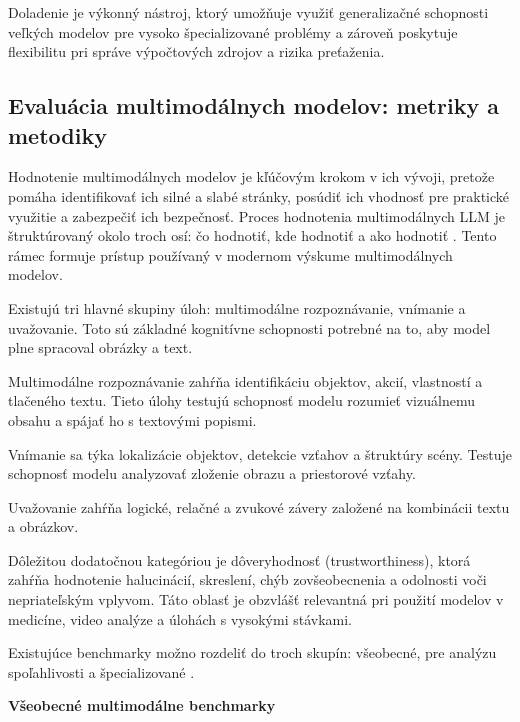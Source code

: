 \documentclass[]{tukediphc}
\begin{document}
Doladenie je výkonný nástroj, ktorý umožňuje využiť generalizačné schopnosti veľkých modelov pre vysoko špecializované problémy a zároveň poskytuje flexibilitu pri správe výpočtových zdrojov a rizika preťaženia.





\subsection{Evaluácia multimodálnych modelov: metriky a metodiky}

Hodnotenie multimodálnych modelov je kľúčovým krokom v ich vývoji, pretože pomáha identifikovať ich silné a slabé stránky, posúdiť ich vhodnosť pre praktické využitie a zabezpečiť ich bezpečnosť. Proces hodnotenia multimodálnych LLM je štruktúrovaný okolo troch osí: čo hodnotiť, kde hodnotiť a ako hodnotiť \cite{researchgate:A_Survey_on_Evaluation_of_Multimodal_Large_Language_Models}. Tento rámec formuje prístup používaný v modernom výskume multimodálnych modelov.

Existujú tri hlavné skupiny úloh: multimodálne rozpoznávanie, vnímanie a uvažovanie. Toto sú základné kognitívne schopnosti potrebné na to, aby model plne spracoval obrázky a text. \cite{researchgate:A_Survey_on_Evaluation_of_Multimodal_Large_Language_Models}

Multimodálne rozpoznávanie zahŕňa identifikáciu objektov, akcií, vlastností a tlačeného textu. Tieto úlohy testujú schopnosť modelu rozumieť vizuálnemu obsahu a spájať ho s textovými popismi.

Vnímanie sa týka lokalizácie objektov, detekcie vzťahov a štruktúry scény. Testuje schopnosť modelu analyzovať zloženie obrazu a priestorové vzťahy.

Uvažovanie zahŕňa logické, relačné a zvukové závery založené na kombinácii textu a obrázkov.

Dôležitou dodatočnou kategóriou je dôveryhodnosť (trustworthiness), ktorá zahŕňa hodnotenie halucinácií, skreslení, chýb zovšeobecnenia a odolnosti voči nepriateľským vplyvom. Táto oblasť je obzvlášť relevantná pri použití modelov v medicíne, video analýze a úlohách s vysokými stávkami.

Existujúce benchmarky možno rozdeliť do troch skupín: všeobecné, pre analýzu spoľahlivosti a špecializované \cite{researchgate:A_Survey_on_Evaluation_of_Multimodal_Large_Language_Models}.

\textbf{Všeobecné multimodálne benchmarky}
\end{document}
